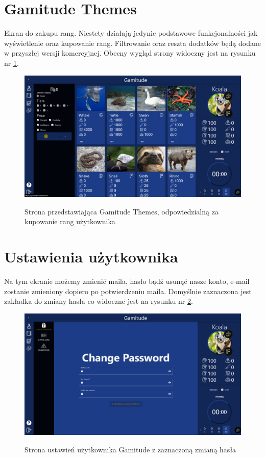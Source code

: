 \documentclass[a4paper,11pt]{report}
\begin{document}
\section{Gamitude Themes}
Ekran do zakupu rang. Niestety działają jedynie podstawowe funkcjonalności jak wyświetlenie oraz kupowanie rang.
Filtrowanie oraz reszta dodatków będą dodane w przyszłej wersji komercyjnej.
Obecny wygląd strony widoczny jest na rysunku nr \ref{fig:Gamitude_Themes}.
\begin{figure}[H]
	\centering
	\includegraphics[scale=0.3]{prezentacja/Gamitude_Themes}\\
	\caption{Strona przedstawiająca Gamitude Themes, odpowiedzialną za kupowanie rang użytkownika}
	\label{fig:Gamitude_Themes}
\end{figure}
\section{Ustawienia użytkownika}
Na tym ekranie możemy zmienić maila, hasło bądź usunąć nasze konto, e-mail zostanie zmieniony dopiero po potwierdzeniu maila.
Domyślnie zaznaczona jest zakładka do zmiany hasła co widoczne jest na rysunku nr \ref{fig:Settings}.
\begin{figure}[H]
	\centering
	\includegraphics[scale=0.3]{prezentacja/Settings}\\
	\caption{Strona ustawień użytkownika Gamitude z zaznaczoną zmianą hasła}
	\label{fig:Settings}
\end{figure}
\end{document}
